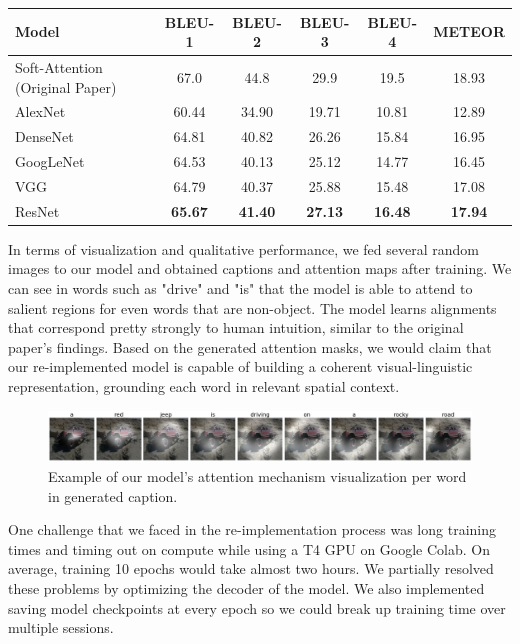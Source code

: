 \documentclass{article}
\begin{document}
\begin{table}[h]
\centering
\begin{adjustbox}{width=.75\textwidth}
\small
\begin{tabular}{lccccc}
\toprule
Model & BLEU-1 & BLEU-2 & BLEU-3 & BLEU-4 & METEOR \\
\midrule
Soft-Attention (Original Paper) & 67.0 & 44.8 & 29.9 & 19.5 & 18.93 \\
AlexNet                & 60.44 & 34.90 & 19.71 & 10.81 & 12.89 \\
DenseNet               & 64.81 & 40.82 & 26.26 & 15.84 & 16.95 \\
GoogLeNet              & 64.53 & 40.13 & 25.12 & 14.77 & 16.45 \\
VGG                    & 64.79 & 40.37 & 25.88 & 15.48 & 17.08 \\
ResNet                 & \textbf{65.67} & \textbf{41.40} & \textbf{27.13} & \textbf{16.48} & \textbf{17.94} \\
\bottomrule
\end{tabular}
\end{adjustbox}
\end{table}

In terms of visualization and qualitative performance, we fed several random images to our model and obtained captions and attention maps after training. We can see in words such as "drive" and "is" that the model is able to attend to salient regions for even words that are non-object. The model learns alignments that correspond pretty strongly to human intuition, similar to the original paper's findings. Based on the generated attention masks, we would claim that our re-implemented model is capable of building a coherent visual-linguistic representation, grounding each word in relevant spatial context. 

\begin{figure}[h]
    \centering
    \includegraphics[width=0.75\linewidth]{example-jeep.png}
    \caption{Example of our model's attention mechanism visualization per word in generated caption.}
    \label{fig:enter-label}
\end{figure}

One challenge that we faced in the re-implementation process was long training times and timing out on compute while using a T4 GPU on Google Colab. On average, training 10 epochs would take almost two hours. We partially resolved these problems by optimizing the decoder of the model. We also implemented saving model checkpoints at every epoch so we could break up training time over multiple sessions.
\end{document}
